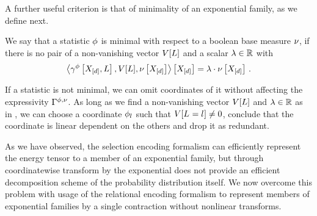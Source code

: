 A further useful criterion is that of minimality of an exponential family, as we define next.

\begin{definition}[Minimal]
    \label{def:minimalStatistics}
    We say that a statistic $\phi$ is minimal with respect to a boolean base measure $\nu$, if there is no pair of a non-vanishing vector $V[L]$ and a scalar $\lambda\in\mathbb{R}$ with
    \begin{align*}
        \left\langle \gamma^{\phi}\left[X_{[d]},L\right],V[L],\nu\left[X_{[d]}\right]\right\rangle \left[ X_{[d]} \right] = \lambda\cdot\nu\left[X_{[d]}\right] \, .
    \end{align*}
\end{definition}

If a statistic is not minimal, we can omit coordinates of it without affecting the expressivity $\Gamma^{\phi,\nu}$.
As long as we find a non-vanishing vector $V[L]$ and $\lambda\in\mathbb{R}$ as in , we can choose a coordinate $\phi_{l}$ such that $V[L_{}=l_{}]\neq0$, conclude that the coordinate is linear dependent on the others and drop it as redundant.



As we have observed, the selection encoding formalism can efficiently represent the energy tensor to a member of an exponential family, but through coordinatewise transform by the exponential does not provide an efficient decomposition scheme of the probability distribution itself.
We now overcome this problem with usage of the relational encoding formalism to represent members of exponential families by a single contraction without nonlinear transforms.

